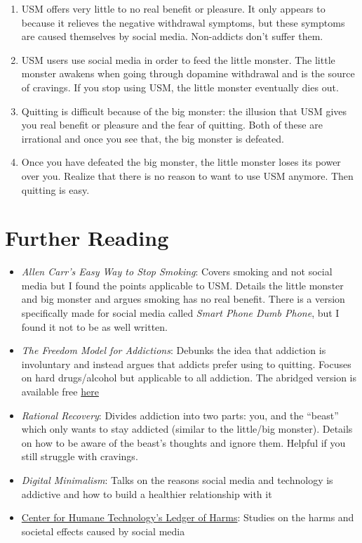 \documentclass[
  openany]{book}
\providecommand{\tightlist}{%
  \setlength{\itemsep}{0pt}\setlength{\parskip}{0pt}}
\begin{document}
\begin{enumerate}
\def\labelenumi{\arabic{enumi}.}
\tightlist
\item
  USM offers very little to no real benefit or pleasure. It only appears to because it relieves the negative withdrawal symptoms, but these symptoms are caused themselves by social media. Non-addicts don't suffer them.
\item
  USM users use social media in order to feed the little monster. The little monster awakens when going through dopamine withdrawal and is the source of cravings. If you stop using USM, the little monster eventually dies out.
\item
  Quitting is difficult because of the big monster: the illusion that USM gives you real benefit or pleasure and the fear of quitting. Both of these are irrational and once you see that, the big monster is defeated.
\item
  Once you have defeated the big monster, the little monster loses its power over you. Realize that there is no reason to want to use USM anymore. Then quitting is easy.
\end{enumerate}

\appendix


\chapter{Further Reading}\label{further-reading}

\begin{itemize}
\tightlist
\item
  \emph{Allen Carr's Easy Way to Stop Smoking}: Covers smoking and not social media but I found the points applicable to USM. Details the little monster and big monster and argues smoking has no real benefit. There is a version specifically made for social media called \emph{Smart Phone Dumb Phone}, but I found it not to be as well written.
\item
  \emph{The Freedom Model for Addictions}: Debunks the idea that addiction is involuntary and instead argues that addicts prefer using to quitting. Focuses on hard drugs/alcohol but applicable to all addiction. The abridged version is available free \href{https://archive.org/details/freedom-model-abridged/Freedom\%20Model\%20Abridged/}{here}
\item
  \emph{Rational Recovery}: Divides addiction into two parts: you, and the ``beast'' which only wants to stay addicted (similar to the little/big monster). Details on how to be aware of the beast's thoughts and ignore them. Helpful if you still struggle with cravings.
\item
  \emph{Digital Minimalism}: Talks on the reasons social media and technology is addictive and how to build a healthier relationship with it
\item
  \href{https://ledger.humanetech.com/}{Center for Humane Technology's Ledger of Harms}: Studies on the harms and societal effects caused by social media
\end{itemize}
\end{document}
